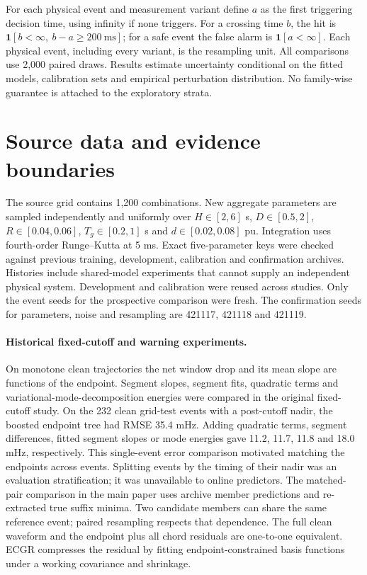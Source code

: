 \documentclass[10pt]{article}
\begin{document}
For each physical event and measurement variant define $a$ as the first triggering decision time, using infinity if none triggers. For a crossing time $b$, the hit is $\mathbf1[b<\infty,\ b-a\ge200~\mathrm{ms}]$; for a safe event the false alarm is $\mathbf1[a<\infty]$. Each physical event, including every variant, is the resampling unit. All comparisons use 2,000 paired draws. Results estimate uncertainty conditional on the fitted models, calibration sets and empirical perturbation distribution. No family-wise guarantee is attached to the exploratory strata.

\section{Source data and evidence boundaries}
The source grid contains 1,200 combinations. New aggregate parameters are sampled independently and uniformly over $H\in[2,6]$ s, $D\in[0.5,2]$, $R\in[0.04,0.06]$, $T_g\in[0.2,1]$ s and $d\in[0.02,0.08]$ pu. Integration uses fourth-order Runge--Kutta at 5 ms. Exact five-parameter keys were checked against previous training, development, calibration and confirmation archives. Histories include shared-model experiments that cannot supply an independent physical system. Development and calibration were reused across studies. Only the event seeds for the prospective comparison were fresh. The confirmation seeds for parameters, noise and resampling are 421117, 421118 and 421119.

\paragraph{Historical fixed-cutoff and warning experiments.}
On monotone clean trajectories the net window drop and its mean slope are functions of the endpoint. Segment slopes, segment fits, quadratic terms and variational-mode-decomposition energies were compared in the original fixed-cutoff study. On the 232 clean grid-test events with a post-cutoff nadir, the boosted endpoint tree had RMSE 35.4 mHz. Adding quadratic terms, segment differences, fitted segment slopes or mode energies gave 11.2, 11.7, 11.8 and 18.0 mHz, respectively. This single-event error comparison motivated matching the endpoints across events. Splitting events by the timing of their nadir was an evaluation stratification; it was unavailable to online predictors. The matched-pair comparison in the main paper uses archive member predictions and re-extracted true suffix minima. Two candidate members can share the same reference event; paired resampling respects that dependence. The full clean waveform and the endpoint plus all chord residuals are one-to-one equivalent. ECGR compresses the residual by fitting endpoint-constrained basis functions under a working covariance and shrinkage.
\end{document}
